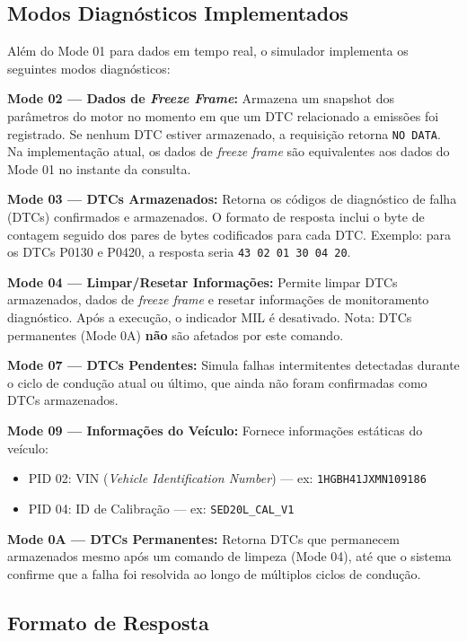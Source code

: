 \subsection{Modos Diagnósticos Implementados}

Além do Mode 01 para dados em tempo real, o simulador implementa os seguintes modos diagnósticos:

\textbf{Mode 02 --- Dados de \textit{Freeze Frame}:} Armazena um snapshot dos parâmetros do motor no momento em que um DTC relacionado a emissões foi registrado. Se nenhum DTC estiver armazenado, a requisição retorna \texttt{NO DATA}. Na implementação atual, os dados de \textit{freeze frame} são equivalentes aos dados do Mode 01 no instante da consulta.

\textbf{Mode 03 --- DTCs Armazenados:} Retorna os códigos de diagnóstico de falha (DTCs) confirmados e armazenados. O formato de resposta inclui o byte de contagem seguido dos pares de bytes codificados para cada DTC. Exemplo: para os DTCs P0130 e P0420, a resposta seria \texttt{43 02 01 30 04 20}.

\textbf{Mode 04 --- Limpar/Resetar Informações:} Permite limpar DTCs armazenados, dados de \textit{freeze frame} e resetar informações de monitoramento diagnóstico. Após a execução, o indicador MIL é desativado. Nota: DTCs permanentes (Mode 0A) \textbf{não} são afetados por este comando.

\textbf{Mode 07 --- DTCs Pendentes:} Simula falhas intermitentes detectadas durante o ciclo de condução atual ou último, que ainda não foram confirmadas como DTCs armazenados.

\textbf{Mode 09 --- Informações do Veículo:} Fornece informações estáticas do veículo:
\begin{itemize}
    \item PID 02: VIN (\textit{Vehicle Identification Number}) --- ex: \texttt{1HGBH41JXMN109186}
    \item PID 04: ID de Calibração --- ex: \texttt{SED20L\_CAL\_V1}
\end{itemize}

\textbf{Mode 0A --- DTCs Permanentes:} Retorna DTCs que permanecem armazenados mesmo após um comando de limpeza (Mode 04), até que o sistema confirme que a falha foi resolvida ao longo de múltiplos ciclos de condução.

\subsection{Formato de Resposta}

